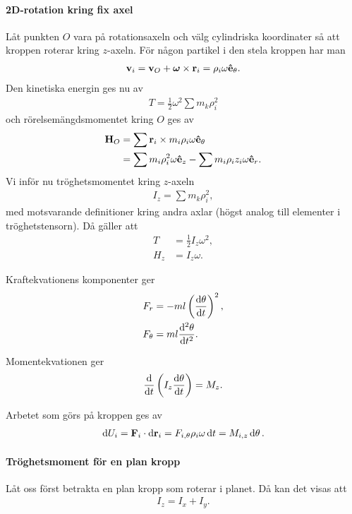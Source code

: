 \paragraph{2D-rotation kring fix axel}
Låt punkten $O$ vara på rotationsaxeln och välg cylindriska koordinater så att kroppen roterar kring $z$-axeln. För någon partikel i den stela kroppen har man
\begin{align*}
	\vb{v}_{i} = \vb{v}_{O} + \vb*{\omega}\times\vb{r}_{i} = \rho_{i}\omega\vu{e}_{\theta}.
\end{align*}
Den kinetiska energin ges nu av
\begin{align*}
	T = \frac{1}{2}\omega^2\sum m_{k}\rho_{i}^2
\end{align*}
och rörelsemängdsmomentet kring $O$ ges av
\begin{align*}
	\vb{H}_{O} &= \sum \vb{r}_{i}\times m_{i}\rho_{i}\omega\vu{e}_{\theta} \\
	           &= \sum m_{i}\rho_{i}^2\omega\vu{e}_{z} - \sum m_{i}\rho_{i}z_{i}\omega\vu{e}_{r}.
\end{align*}
Vi inför nu tröghetsmomentet kring $z$-axeln
\begin{align*}
	I_{z} = \sum m_{k}\rho_{i}^2,
\end{align*}
med motsvarande definitioner kring andra axlar (högst analog till elementer i tröghetstensorn). Då gäller att
\begin{align*}
	T     &= \frac{1}{2}I_{z}\omega^2, \\
	H_{z} &= I_{z}\omega.
\end{align*}

Kraftekvationens komponenter ger
\begin{align*}
	F_{r}      &= -ml\left(\dv{\theta}{t}\right)^2, \\
	F_{\theta} &= ml\dv[2]{\theta}{t}.
\end{align*}

Momentekvationen ger
\begin{align*}
	\dv{t}\left(I_{z}\dv{\theta}{t}\right) = M_{z}.
\end{align*}

Arbetet som görs på kroppen ges av
\begin{align*}
	\dd{U_{i}} = \vb{F}_{i}\cdot\dd{\vb{r}_{i}} = F_{i, \theta}\rho_{i}\omega\dd{t} = M_{i, z}\dd{\theta}.
\end{align*}

\paragraph{Tröghetsmoment för en plan kropp}
Låt oss först betrakta en plan kropp som roterar i planet. Då kan det visas att
\begin{align*}
	I_{z} = I_{x} + I_{y}.
\end{align*}

